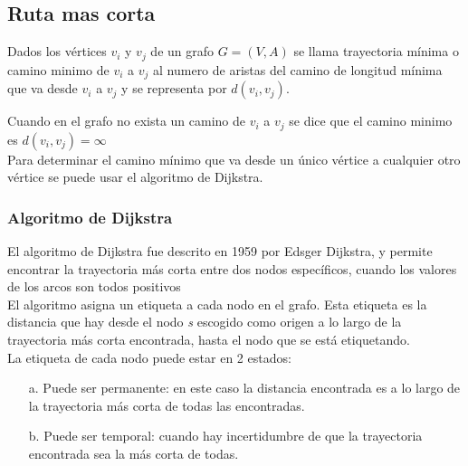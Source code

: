       
    \subsection{Ruta mas corta} %
    \label{sub:ruta_mas_corta}
      Dados los vértices $v_{i}$ y $v_{j}$ de un grafo $G = (V,A)$ se llama trayectoria mínima o camino minimo  de \(v_i\) a \(v_j\) al numero de aristas del camino de longitud mínima que va desde $v_i$ a $v_j$ y se representa por $d(v_i, v_j)$.

      Cuando en el grafo no exista un camino de $v_i$ a $v_j$ se dice que el camino minimo es $d(v_i, v_j) = \infty$ \\

      Para determinar el camino mínimo que va desde un único vértice a cualquier otro vértice se puede usar el algoritmo de Dijkstra. 
      


      \subsubsection{Algoritmo de Dijkstra} %
      \label{sub:algoritmo_de_dijkstra}
      El algoritmo de  Dijkstra fue descrito en 1959 por Edsger Dijkstra, y permite encontrar la trayectoria más corta entre dos nodos específicos, cuando los valores de los arcos son todos positivos\\

      El algoritmo asigna un etiqueta a cada nodo en el grafo. Esta etiqueta es la distancia que hay desde el nodo \emph{s} escogido como origen a lo largo de la trayectoria más corta encontrada, hasta el nodo que se está etiquetando.\\

      La etiqueta de cada nodo puede estar en 2 estados:

      \begin{itemize}
        \item[a.] Puede ser permanente: en este caso la distancia encontrada es a lo largo de la trayectoria más corta de todas las encontradas.
        \item[b.] Puede ser temporal: cuando hay incertidumbre de que la trayectoria encontrada sea la más corta de todas.
      \end{itemize}

